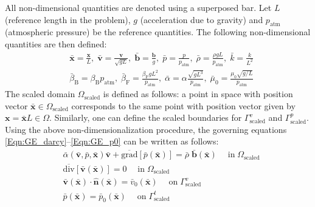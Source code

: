\documentclass[11pt,reqno]{amsart}
\begin{document}
All non-dimensional quantities are denoted using 
a superposed bar. Let $L$ (reference length in 
the problem), $g$ (acceleration due to gravity) 
and $p_{\mathrm{atm}}$ (atmospheric pressure) be the 
reference quantities. The following non-dimensional 
quantities are then defined: 
\begin{align}
   &\bar{\mathbf{x}} = \frac{\mathbf{x}}{L}, \; 
  \bar{\mathbf{v}} = \frac{\mathbf{v}}{\sqrt{gL}}, \; 
  \bar{\mathbf{b}} = \frac{\mathbf{b}}{g}, \;
  \bar{p} = \frac{p}{p_{\mathrm{atm}}}, \;
  \bar{\rho} = \frac{\rho g L}{p_{\mathrm{atm}}}, \;
  \bar{k} = \frac{k}{L^{2}}\nonumber\\ 
&\bar{\beta}_{\mathrm{B}} = \beta_{\mathrm{B}}p_{\mathrm{atm}}, \; 
  \bar{\beta}_{\mathrm{F}} = \frac{\beta_{\mathrm{F}}gL^{2}}{p_{\mathrm{atm}}}, \;
  \bar{\alpha} = \alpha \frac{\sqrt{gL^{3}}}{p_{\mathrm{atm}}}, \;
  \bar{\mu}_0 = \frac{\mu_0 \sqrt{g/L}}{p_{\mathrm{atm}}}
\end{align}
The scaled domain $\Omega_{\mathrm{scaled}}$ is defined 
as follows: a point in space with position vector $\bar{\mathbf{x}} \in 
\Omega_{\mathrm{scaled}}$ corresponds to the same point with position vector 
given by $\mathbf{x} = \bar{\mathbf{x}} L \in \Omega$. Similarly, one can 
define the scaled boundaries for $\Gamma^{v}_{\mathrm{scaled}}$ and $\Gamma^{p}_{\mathrm{scaled}}$. 
Using the above non-dimensionalization 
procedure, the governing equations 
\eqref{Eqn:GE_darcy}--\eqref{Eqn:GE_p0} 
can be written as follows:
\begin{subequations}
  \label{Eqn:DF_EXP_Governing}
  \begin{align}
    &\bar{\alpha}(\bar{\mathbf{v}},\bar{p},\bar{\mathbf{x}}) \bar{\mathbf{v}} + \overline{\mathrm{grad}} 
    [\bar{p}(\bar{\mathbf{x}})] = \bar{\rho} \; \bar{\mathbf{b}}(\bar{\mathbf{x}}) \quad 
    \; \mathrm{in} \; {\Omega}_{\mathrm{scaled}} \\
&\overline{\mathrm{div}}[{\mathbf{\bar{v}}}(\bar{\mathbf{x}})]  = 0 \quad \; 
    \mathrm{in} \; {\Omega}_{\mathrm{scaled}} \\
&\bar{\mathbf{v}}(\bar{\mathbf{x}})\cdot\mathbf{\hat{n}}(\bar{\mathbf{x}}) = 
    \bar{v}_{0}(\bar{\mathbf{x}})  \quad \; 
        \mathrm{on} \; {\Gamma}^{v}_{\mathrm{scaled}} \\
&\bar{p}(\bar{\mathbf{x}}) = 
        \bar{p}_{0} (\bar{\mathbf{x}}) 
    \quad \; \mathrm{on} \; {\Gamma}^{t}_{\mathrm{scaled}}
\end{align}
\end{subequations}
\end{document}

